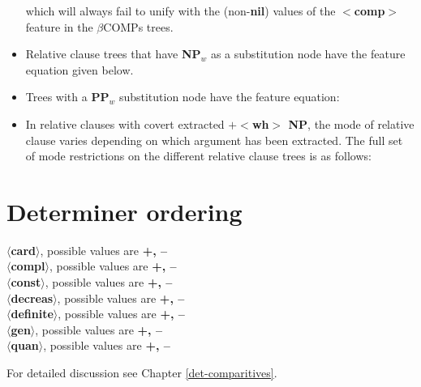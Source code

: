 \begin{itemize}

which will always fail to unify with the (non-{\bf nil}) values of the {\bf
$<$comp$>$} feature in the $\beta$COMPs trees.

\item Relative clause trees that have {\bf NP$_{w}$} as a substitution
node have the feature equation given below.


\item Trees with a {\bf PP$_{w}$} substitution node have the feature
equation:


\item In relative clauses with covert extracted {\bf $+<$wh$>$ NP}, the
mode of relative clause varies depending on which argument has been
extracted. The full set of mode restrictions on the different relative
clause trees is as follows:


\end{itemize}

\section{Determiner ordering}
{\bf $\langle$card$\rangle$}, possible values are {\bf +, --}\\
{\bf $\langle$compl$\rangle$}, possible values are {\bf +, --}\\
{\bf $\langle$const$\rangle$}, possible values are {\bf +, --}\\
{\bf $\langle$decreas$\rangle$}, possible values are {\bf +, --}\\
{\bf $\langle$definite$\rangle$}, possible values are {\bf +, --}\\
{\bf $\langle$gen$\rangle$}, possible values are {\bf +, --}\\
{\bf $\langle$quan$\rangle$}, possible values are {\bf +, --}

For detailed discussion see Chapter \ref{det-comparitives}.

